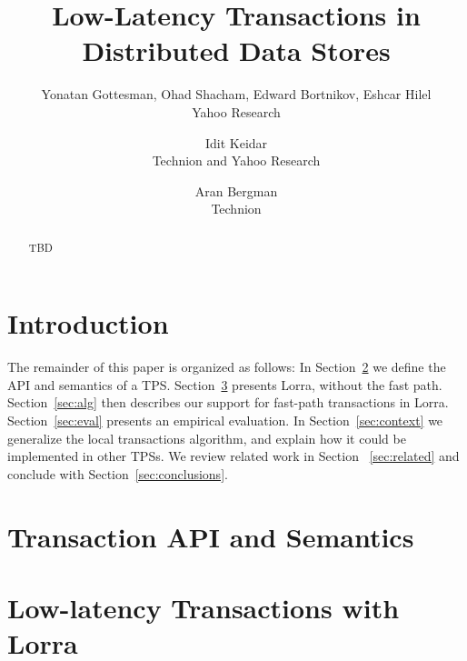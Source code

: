 \documentclass[letterpaper,twocolumn,10pt]{article}
\newcommand{\inred}[1]{{\color{red}{#1}}}
\newcommand{\Idit}[1]{[[\inred{Idit: #1}]]}
\newcommand{\sys}{Lorra}
\begin{document}
\date{}

\title{\Large \bf Low-Latency Transactions in Distributed Data Stores}

\author{
{\rm Yonatan Gottesman, Ohad Shacham,  Edward Bortnikov, Eshcar Hilel}\\
	Yahoo Research
\and 
{\rm Idit Keidar}\\
	Technion and Yahoo Research
\and 
{\rm  Aran Bergman}\\
 	{Technion}
} %


\maketitle




\begin{abstract}
TBD
\end{abstract}


\section{Introduction} \label{sec:intro}


The remainder of this paper is organized as follows:
In Section~\ref{sec:api} we define the  API and semantics of a TPS. 
Section~\ref{sec:ll} presents \sys, without the fast path. 
Section~\ref{sec:alg} then describes our support for fast-path  transactions in \sys.  
Section~\ref{sec:eval} presents an empirical evaluation.
In Section~\ref{sec:context} we generalize the local transactions algorithm, and explain how it could be implemented in 
other TPSs. 
 We review related work in Section ~\ref{sec:related} and conclude with Section~\ref{sec:conclusions}.


\section{Transaction API and Semantics} \label{sec:api}



\section{Low-latency Transactions with \sys} \label{sec:ll}


\end{document}
